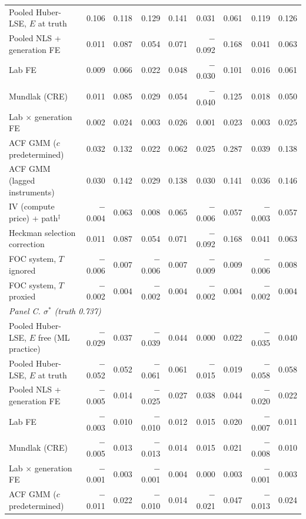 \begin{table}[!htbp]
\begin{threeparttable}
\begin{tabular}{lrrrrrrrr}
Pooled Huber-LSE, $E$ at truth & 0.106 & 0.118 & 0.129 & 0.141 & 0.031 & 0.061 & 0.119 & 0.126 \\
Pooled NLS + generation FE & 0.011 & 0.087 & 0.054 & 0.071 & $-$0.092 & 0.168 & 0.041 & 0.063 \\
Lab FE & 0.009 & 0.066 & 0.022 & 0.048 & $-$0.030 & 0.101 & 0.016 & 0.061 \\
Mundlak (CRE) & 0.011 & 0.085 & 0.029 & 0.054 & $-$0.040 & 0.125 & 0.018 & 0.050 \\
Lab $\times$ generation FE & 0.002 & 0.024 & 0.003 & 0.026 & 0.001 & 0.023 & 0.003 & 0.025 \\
ACF GMM ($c$ predetermined) & 0.032 & 0.132 & 0.022 & 0.062 & 0.025 & 0.287 & 0.039 & 0.138 \\
ACF GMM (lagged instruments) & 0.030 & 0.142 & 0.029 & 0.138 & 0.030 & 0.141 & 0.036 & 0.146 \\
IV (compute price) + path$^{\ddagger}$ & $-$0.004 & 0.063 & 0.008 & 0.065 & $-$0.006 & 0.057 & $-$0.003 & 0.057 \\
Heckman selection correction & 0.011 & 0.087 & 0.054 & 0.071 & $-$0.092 & 0.168 & 0.041 & 0.063 \\
FOC system, $T$ ignored & $-$0.006 & 0.007 & $-$0.006 & 0.007 & $-$0.009 & 0.009 & $-$0.006 & 0.008 \\
FOC system, $T$ proxied & $-$0.002 & 0.004 & $-$0.002 & 0.004 & $-$0.002 & 0.004 & $-$0.002 & 0.004 \\
\midrule
\multicolumn{9}{l}{\textit{Panel C. $\sigma^*$ (truth 0.737)}} \\
Pooled Huber-LSE, $E$ free (ML practice) & $-$0.029 & 0.037 & $-$0.039 & 0.044 & 0.000 & 0.022 & $-$0.035 & 0.040 \\
Pooled Huber-LSE, $E$ at truth & $-$0.052 & 0.052 & $-$0.061 & 0.061 & $-$0.015 & 0.019 & $-$0.058 & 0.058 \\
Pooled NLS + generation FE & $-$0.005 & 0.014 & $-$0.025 & 0.027 & 0.038 & 0.044 & $-$0.020 & 0.022 \\
Lab FE & $-$0.003 & 0.010 & $-$0.010 & 0.012 & 0.015 & 0.020 & $-$0.007 & 0.011 \\
Mundlak (CRE) & $-$0.005 & 0.013 & $-$0.013 & 0.014 & 0.015 & 0.021 & $-$0.008 & 0.010 \\
Lab $\times$ generation FE & $-$0.001 & 0.003 & $-$0.001 & 0.004 & 0.000 & 0.003 & $-$0.001 & 0.003 \\
ACF GMM ($c$ predetermined) & $-$0.011 & 0.022 & $-$0.010 & 0.014 & $-$0.021 & 0.047 & $-$0.013 & 0.024 \\

\end{tabular}
\end{threeparttable}
\end{table}
